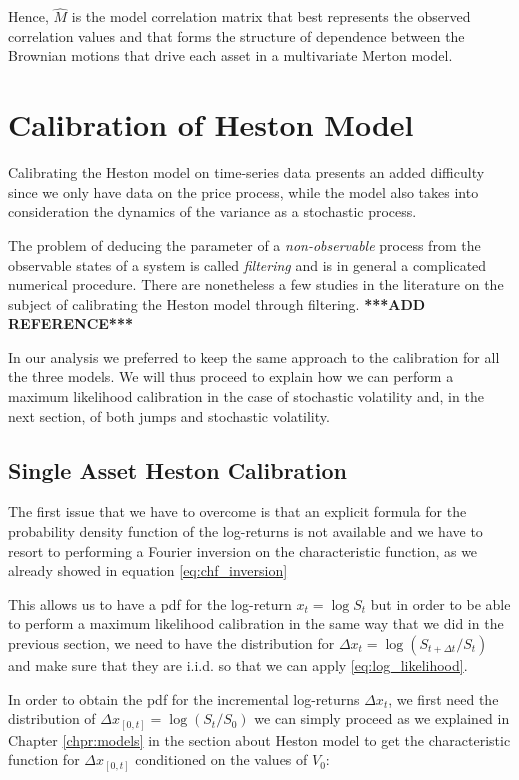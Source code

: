 Hence, $\widehat{M}$ is the model correlation matrix that best represents the observed correlation values and that forms the structure of dependence between the Brownian motions that drive each asset in a multivariate Merton model.

\section{Calibration of Heston Model}
Calibrating the Heston model on time-series data presents an added difficulty since we only have data on the price process, while the model also takes into consideration the dynamics of the variance as a stochastic process. 

The problem of deducing the parameter of a \textit{non-observable} process from the observable states of a system is called \textit{filtering} and is in general a complicated numerical procedure. There are nonetheless a few studies in the literature on the subject of calibrating the Heston model through filtering. \textbf{***ADD REFERENCE***}

In our analysis we preferred to keep the same approach to the calibration for all the three models. We will thus proceed to explain how we can perform a maximum likelihood calibration in the case of stochastic volatility and, in the next section, of both jumps and stochastic volatility.

\subsection{Single Asset Heston Calibration}
The first issue that we have to overcome is that an explicit formula for the probability density function of the log-returns is not available and we have to resort to performing a Fourier inversion on the characteristic function, as we already showed in equation \eqref{eq:chf_inversion}

This allows us to have a pdf for the log-return $x_t = \log S_t $ but in order to be able to perform a maximum likelihood calibration in the same way that we did in the  previous section, we need to have the distribution for $\Delta x_t = \log (S_{t + \Delta t} / S_t)$ and make sure that they are i.i.d. so that we can apply \eqref{eq:log_likelihood}.

In order to obtain the pdf for the incremental log-returns $\Delta x_t$, we first need the distribution of  $\Delta x_{[0, t] }= \log (S_t / S_0)$ we can simply proceed as we explained in Chapter \ref{chpr:models} in the section about Heston model to get the characteristic function for $\Delta x_{[0, t] }$ conditioned on the values of $V_0$: 

